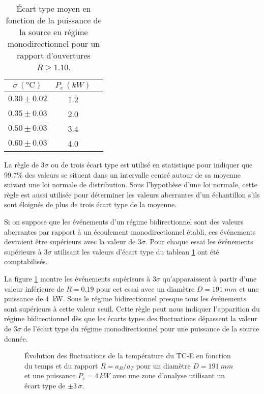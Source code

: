 \begin{table}[H]
\centering
\caption{Écart type moyen en fonction de la puissance de la source en régime monodirectionnel pour un rapport d'ouvertures $R \geq 1.10$.}
\setlength\extrarowheight{0.5pt}
\begin{tabular}{c c c}
\hline
$\sigma\,(\si{\celsius})$ & $P_e\,(\si{kW})$ \rule{0pt}{14pt}\\[0.5ex]
\hline
$0.30 \pm 0.02$ & 1.2 \\ 
$0.35 \pm 0.03$ & 2.0 \\ 
$0.50 \pm 0.03$ & 3.4 \\
$0.60 \pm 0.03$ & 4.0 \\  
\hline
\end{tabular}
\label{tab:ecart_type_moyen}
\end{table}

La règle de $3\sigma$ ou de trois écart type est utilisé en statistique pour indiquer que 99.7\% des valeurs se situent dans un intervalle centré autour de sa moyenne suivant une loi normale de distribution. Sous l'hypothèse d'une loi normale, cette règle est aussi utilisée pour déterminer les valeurs aberrantes d'un échantillon s'ils sont éloignés de plus de trois écart type de la moyenne.

Si on suppose que les événements d'un régime bidirectionnel sont des valeurs aberrantes par rapport à un écoulement monodirectionnel établi, ces événements devraient être supérieurs avec la valeur de $3\sigma$. Pour chaque essai les événements supérieurs à $3\sigma$ utilisant les valeurs d'écart type du tableau \ref{tab:ecart_type_moyen} ont été comptabilisés. 

La figure \ref{fig:tc_gliss_est_2R_3_sigma} montre les événements supérieurs à $3\sigma$ qu'apparaissent à partir d'une valeur inférieure de $R=0.19$ pour cet essai avec un diamètre $D=\SI{191}{mm}$ et une puissance de \SI{4}{kW}. Sous le régime bidirectionnel presque tous les événements sont supérieurs à cette valeur seuil. Cette règle peut nous indiquer l'apparition du régime bidirectionnel dès que les écarts types des fluctuations dépassent la valeur de $3\sigma$ de l’écart type du régime monodirectionnel pour une puissance de la source donnée.

\begin{figure}
\centering
\resizebox{0.725\textwidth}{!}{}
\caption{Évolution des fluctuations de la température du TC-E en fonction du temps et du rapport $R=a_B/a_T$ pour un diamètre $D=\SI{191}{mm}$ et une puissance $P_e=\SI{4}{kW}$ avec une zone d'analyse utilisant un écart type de $\pm 3\,\sigma$.}
\label{fig:tc_gliss_est_2R_3_sigma}
\end{figure}

